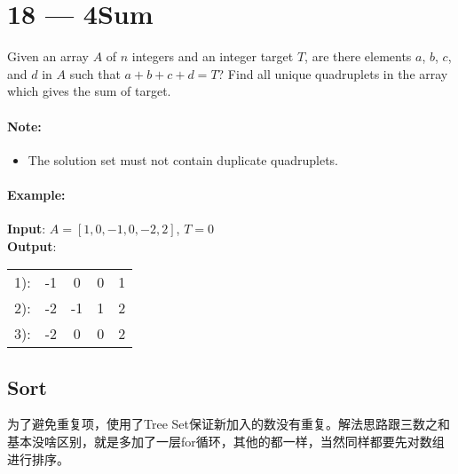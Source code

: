 \section{18 --- 4Sum}
Given an array $A$ of $ n $ integers and an integer target $ T $, are there elements $ a $, $ b $, $ c $, and $ d $ in $ A $ such that $ a + b + c + d = T $? Find all unique quadruplets in the array which gives the sum of target.

\paragraph{Note:}

\begin{itemize}
\item The solution set must not contain duplicate quadruplets.
\end{itemize}

\paragraph{Example:}

\begin{flushleft}
\textbf{Input}: $A = [1, 0, -1, 0, -2, 2]$, $T = 0$
\\
\textbf{Output}: 
\begin{table}[H]
\begin{tabular}{lcccc}
1): & -1 &  0 & 0 & 1  \\
2): & -2 & -1 & 1 & 2  \\
3): & -2  & 0 & 0 & 2 
\end{tabular}
\end{table}
\end{flushleft}

\subsection{Sort}
为了避免重复项，使用了Tree Set保证新加入的数没有重复。解法思路跟三数之和基本没啥区别，就是多加了一层for循环，其他的都一样，当然同样都要先对数组进行排序。

